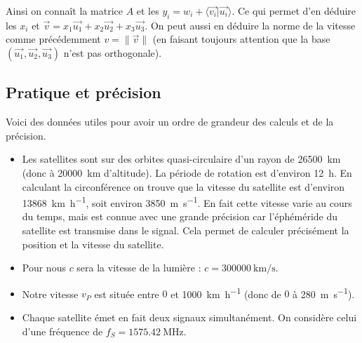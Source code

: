 \documentclass[class=report,crop=false]{standalone}
\newcommand{\vect}{\overrightarrow}
\begin{document}
Ainsi on connaît la matrice $A$ et les $y_i = w_i + \langle \vect{v_i} | \vect{u_i} \rangle$. Ce qui permet d'en déduire
les $x_i$ et 
$\vect v = x_1 \vect{u_1}+x_2 \vect{u_2}+x_3 \vect{u_3}$.
On peut aussi en déduire la norme de la vitesse comme précédemment
$v = \| \vect v \|$ (en faisant toujours attention que la base
$(\vect {u_1}, \vect {u_2}, \vect {u_3})$ n'est pas orthogonale).


\subsection{Pratique et précision}

Voici des données utiles pour avoir un ordre de grandeur des calculs et de la précision.

\begin{itemize}
  \item Les satellites sont sur des orbites quasi-circulaire d'un rayon de 
  \SI{26500}{\kilo\meter} (donc à \SI{20000}{\kilo\meter} d'altitude).
  La période de rotation est d'environ \SI{12}{\hour}.
  En calculant la circonférence on trouve que la vitesse du satellite est d'environ
  \SI{13868}{\kilo\meter\per\hour}, soit environ \SI{3850}{\meter\per\second}.
  En fait cette vitesse varie au cours du temps, mais est connue avec une grande précision 
  car l'éphéméride du satellite est transmise dans le signal. Cela permet de calculer
  précisément la position et la vitesse du satellite.
 
  
  \item Pour nous $c$ sera la vitesse de la lumière :
  $c = \SI{300000}{\kilo\meter\per\second}$.
  
  \item Notre vitesse $v_P$ est située entre $0$ et \SI{1000}{\kilo\meter\per\hour}
  (donc de $0$ à \SI{280}{\meter\per\second}).
  
  \item Chaque satellite émet en fait deux signaux simultanément. On considère celui
  d'une fréquence de $f_S = \SI{1575.42}{\mega\hertz}$.
  
\end{itemize}
\end{document}

